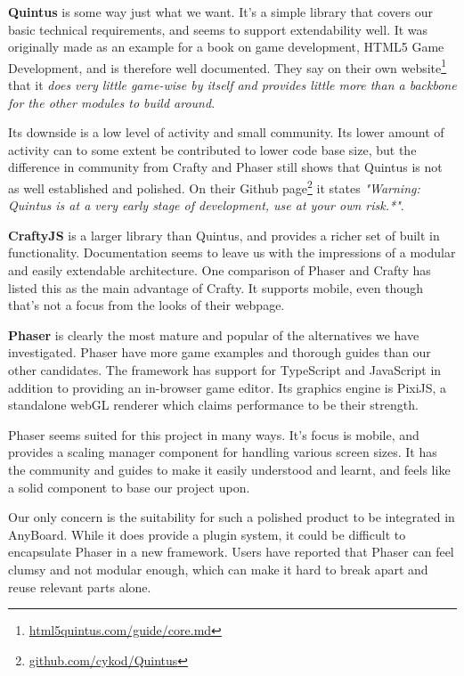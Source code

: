 \textbf{Quintus} is some way just what we want. It's a simple library that covers our basic technical requirements, and seems to support extendability well. It was originally made as an example for a book on game development, HTML5 Game Development\cite{rettig2012professional}, and is therefore well documented. They say on their own website\footnote{\href{http://www.html5quintus.com/guide/core.md}{html5quintus.com/guide/core.md}} that it \emph{does very little game-wise by itself and provides little more than a backbone for the other modules to build around}.

Its downside is a low level of activity and small community. Its lower amount of activity can to some extent be contributed to lower code base size, but the difference in community from Crafty and Phaser still shows that Quintus is not as well established and polished. On their Github page\footnote{\href{https://github.com/cykod/Quintus}{github.com/cykod/Quintus}} it states \emph{"Warning: Quintus is at a very early stage of development, use at your own risk.*"}.

\textbf{CraftyJS} is a larger library than Quintus, and provides a richer set of built in functionality. Documentation seems to leave us with the impressions of a modular and easily extendable architecture. One comparison of Phaser and Crafty\cite{phaser_vs_craftyjs} has listed this as the main advantage of Crafty. It supports mobile, even though that's not a focus from the looks of their webpage.

\textbf{Phaser} is clearly the most mature and popular of the alternatives we have investigated. Phaser have more game examples and thorough guides than our other candidates. The framework has support for TypeScript and JavaScript in addition to providing an in-browser game editor. Its graphics engine is PixiJS, a standalone webGL renderer which claims performance to be their strength. 

Phaser seems suited for this project in many ways. It's focus is mobile, and provides a scaling manager component for handling various screen sizes. It has the community and guides to make it easily understood and learnt, and feels like a solid component to base our project upon.

Our only concern is the suitability for such a polished product to be integrated in AnyBoard. While it does provide a plugin system, it could be difficult to encapsulate Phaser in a new framework. Users have reported that Phaser can feel clumsy and not modular enough\cite{phaser_vs_craftyjs, search_for_javascript_ge}, which can make it hard to break apart and reuse relevant parts alone.

